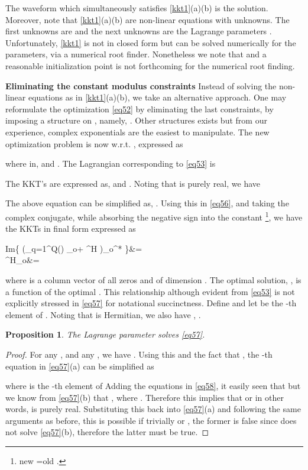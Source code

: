 \documentclass[11pt,draftclsnofoot,onecolumn]{IEEEtran}
\newtheorem{prop}{\bf{Proposition}}
\theoremstyle{definition}
\theoremstyle{remark}
\begin{document}
The waveform which simultaneously satisfies \eqref{kkt1}(a)(b) is the solution. Moreover, note that \eqref{kkt1}(a)(b) are  non-linear equations with  unknowns. The first  unknowns are  and the next  unknowns are the Lagrange parameters . Unfortunately, \eqref{kkt1} is not in closed form but can be solved numerically for the  parameters,  via a numerical root finder. Nonetheless we note that  and a reasonable initialization point is not forthcoming for the numerical root finding. 

{\bf Eliminating the constant modulus constraints} Instead of solving the  non-linear equations as in \eqref{kkt1}(a)(b), we take an alternative approach. One may reformulate the optimization \eqref{eq52} by eliminating the last  constraints, by imposing  a structure on , namely, . Other structures exists but from our experience, complex exponentials are the easiest to manipulate. The new optimization problem is now w.r.t. , expressed as

where in,
 and .
The Lagrangian corresponding to \eqref{eq53} is

The KKT's are expressed as,  and . Noting that  is purely real, we have

The above equation can be simplified as, . Using this in \eqref{eq56}, and taking the complex conjugate, while absorbing the negative sign into the constant \footnote{new =old .}, we have the KKTs in final form expressed as
 
\mbox{Im}\left\{ \left(\sum\limits_{q=1}^Q() _o+ ^H  \right)\odot {}_o^* \right\}&= \\
^H_o&=\kappa

where  is a column vector of all zeros and of dimension . The optimal solution, , is a  function of the optimal . This relationship although evident from \eqref{eq53} is not explicitly stressed in \eqref{eq57} for notational succinctness. Define  and let  be the -th element of . Noting that  is Hermitian, we also have , .

\begin{prop}\label{propos6}
The Lagrange parameter  solves \eqref{eq57}.
\end{prop}
\begin{proof}
For any , and any , we have . Using this and the fact that , the -th equation in \eqref{eq57}(a) can be simplified as

where  is the -th element of   Adding the  equations in \eqref{eq58}, it easily seen that  but we know from \eqref{eq57}(b) that , where . Therefore this implies that  or in other words,  is purely real. Substituting this back into \eqref{eq57}(a) and following the same arguments as before, this is possible if trivially  or , the former is false since  does not solve \eqref{eq57}(b), therefore the latter must be true.
\end{proof}
\end{document}
